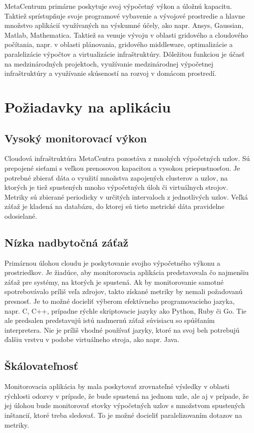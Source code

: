 \documentclass[11pt,final,oneside]{fithesis}
\begin{document}
MetaCentrum primárne poskytuje svoj výpočetný výkon a úložnú kapacitu. Taktiež sprístupňuje svoje programové vybavenie a vývojové prostredie a hlavne množstvo aplikácií využívaných na výskumné účely, ako napr. 
Ansys, Gaussian, Matlab, Mathematica. Taktiež sa venuje vývoju v oblasti gridového a cloudového počítania, napr. v oblasti plánovania, gridového middleware, optimalizácie a paralelizácie výpočtov a virtualizácie
infraštruktúry. Dôležitou funkciou je účasť na medzinárodných projektoch, využívanie medzinárodnej výpočetnej infraštruktúry a využívanie skúseností na rozvoj v domácom prostredí.

\section{Požiadavky na aplikáciu}
\subsection{Vysoký monitorovací výkon}
Cloudová infraštruktúra MetaCentra pozostáva z mnohých výpočetných uzlov. Sú prepojené sieťami s veľkou prenosovou kapacitou a vysokou priepustnosťou. Je potrebné zbierať dáta o využití množstva zapojených
clusterov a uzlov, na ktorých je tiež spustených mnoho výpočetných úloh či virtuálnych strojov. Metriky sú zbierané periodicky v určitých intervaloch z jednotlivých uzlov. Veľká záťaž je kladená na databázu, do ktorej
sú tieto metrické dáta pravidelne odosielané.

\subsection{Nízka nadbytočná záťaž}
Primárnou úlohou cloudu je poskytovanie svojho výpočetného výkonu a prostriedkov. Je žiadúce, aby monitorovacia aplikácia predstavovala čo najmenšiu záťaž pre systémy, na ktorých je spustená. Ak by monitorovanie
samotné spotrebovávalo príliš veľa zdrojov, takto získané metriky by nemali požadovanú presnosť. Je to možné docieliť výberom efektívneho programovacieho jazyka, napr. C, C++, prípadne rýchle skriptovacie 
jazyky ako Python, Ruby či Go. Tie ale predsalen predstavujú istú nadmernú záťaž súvisiacu so spúšťaním interpretera. 
Nie je príliš vhodné používať jazyky, ktoré na svoj beh potrebujú ďalšiu vrstvu v podobe virtuálneho stroja, ako napr. Java.

\subsection{Škálovateľnosť}
Monitorovacia aplikácia by mala poskytovať zrovnateľné výsledky v oblasti rýchlosti odozvy v prípade, že bude spustená na jednom uzle, ale aj v prípade, že jej úlohou bude monitorovať stovky 
výpočetných uzlov s množstvom spustených inštancií, ktoré treba sledovať. To je možné docieliť paralelizovaním dotazov na metriky.
\end{document}
